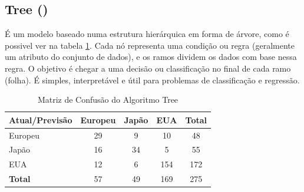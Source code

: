 \documentclass[conference]{IEEEtran}
\begin{document}
\subsection{Tree (\cite{tree})}
É um modelo baseado numa estrutura hierárquica em forma de árvore, como é possivel ver na tabela \ref{tab:conf_matrix_tree}.
Cada nó representa uma condição ou regra (geralmente um atributo do conjunto de dados), e os ramos dividem os dados com base
nessa regra. O objetivo é chegar a uma decisão ou classificação no final de cada ramo (folha). É simples, interpretável e
útil para problemas de classificação e regressão.
\begin{table}[!ht]
	\centering
	\begin{tabular}{lcccc}
		\toprule
		\textbf{Atual/Previsão} & \textbf{Europeu} & \textbf{Japão} & \textbf{EUA} & \textbf{Total} \\
		\midrule
		Europeu                 & 29               & 9              & 10           & 48             \\
		Japão                   & 16               & 34             & 5            & 55             \\
		EUA                     & 12               & 6              & 154          & 172            \\
		\midrule
		\textbf{Total}          & 57               & 49             & 169          & 275            \\
		\bottomrule
	\end{tabular}
	\caption{Matriz de Confusão do Algoritmo Tree}
	\label{tab:conf_matrix_tree}

\end{table}

\end{document}
